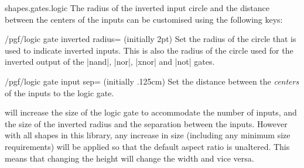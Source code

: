 \begin{pgflibrary}{shapes.gates.logic}
The radius of the inverted input circle and the distance between the 
centers of the inputs can be customised using the following keys:

\begin{key}{/pgf/logic gate inverted radius= (initially 2pt)}
  Set the radius of the circle that is used to indicate inverted
  inputs. This is also the radius of the circle used for the inverted
  output of the |nand|, |nor|, |xnor| and |not| gates. 
    
\begin{codeexample}[]
\end{codeexample} 
\end{key}

\begin{key}{/pgf/logic gate input sep= (initially .125cm)}
  Set the distance between the \emph{centers} of the inputs to the
  logic gate. 
  
\begin{codeexample}[]
\end{codeexample} 
\end{key}
 
  \pgfname{} will increase the size of the 
  logic gate to accommodate the number of inputs, and the size
  of the inverted radius and the separation between the inputs.
  However with all shapes in this library, any increase in size 
  (including any minimum size requirements) will be applied so that 
  the default aspect ratio is unaltered. This means that changing
  the height will change the width and vice versa. 

\end{pgflibrary}

